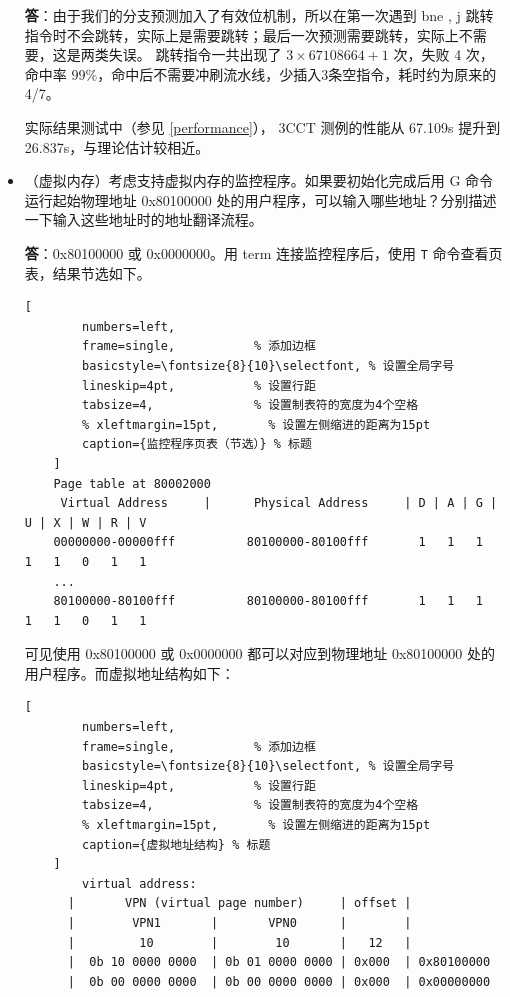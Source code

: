 \documentclass[12pt,a4paper,oneside]{ctexart}
\begin{document}
\begin{itemize}
    \textbf{答}：由于我们的分支预测加入了有效位机制，所以在第一次遇到 bne , j 跳转指令时不会跳转，实际上是需要跳转；最后一次预测需要跳转，实际上不需要，这是两类失误。
    跳转指令一共出现了 $3\times 67108664+1$ 次，失败 4 次，命中率 $99\%$，命中后不需要冲刷流水线，少插入3条空指令，耗时约为原来的 4/7。
    
    实际结果测试中（参见 \ref{performance}）， 3CCT 测例的性能从 67.109s 提升到 26.837s，与理论估计较相近。 %
    
    
    
    \item （虚拟内存）考虑支持虚拟内存的监控程序。如果要初始化完成后用 G 命令运行起始物理地址 0x80100000 处的用户程序，可以输入哪些地址？分别描述一下输入这些地址时的地址翻译流程。
    
    \textbf{答}：0x80100000 或 0x0000000。用 term 连接监控程序后，使用 \texttt{T} 命令查看页表，结果节选如下。
    
    \begin{lstlisting}[
        numbers=left,
        frame=single,           % 添加边框
        basicstyle=\fontsize{8}{10}\selectfont, % 设置全局字号
        lineskip=4pt,           % 设置行距
        tabsize=4,              % 设置制表符的宽度为4个空格
        % xleftmargin=15pt,       % 设置左侧缩进的距离为15pt
        caption={监控程序页表（节选）} % 标题
    ] 
    Page table at 80002000
     Virtual Address     |      Physical Address     | D | A | G | U | X | W | R | V
    00000000-00000fff          80100000-80100fff       1   1   1   1   1   0   1   1
    ...
    80100000-80100fff          80100000-80100fff       1   1   1   1   1   0   1   1
    \end{lstlisting}

    可见使用 0x80100000 或 0x0000000 都可以对应到物理地址 0x80100000 处的用户程序。而虚拟地址结构如下：
    \begin{lstlisting}[
        numbers=left,
        frame=single,           % 添加边框
        basicstyle=\fontsize{8}{10}\selectfont, % 设置全局字号
        lineskip=4pt,           % 设置行距
        tabsize=4,              % 设置制表符的宽度为4个空格
        % xleftmargin=15pt,       % 设置左侧缩进的距离为15pt
        caption={虚拟地址结构} % 标题
    ] 
        virtual address:
      |       VPN (virtual page number)     | offset |
      |        VPN1       |       VPN0      |        |
      |         10        |        10       |   12   |
      |  0b 10 0000 0000  | 0b 01 0000 0000 | 0x000  | 0x80100000
      |  0b 00 0000 0000  | 0b 00 0000 0000 | 0x000  | 0x00000000
    \end{lstlisting}
    

\end{itemize}
\end{document}
